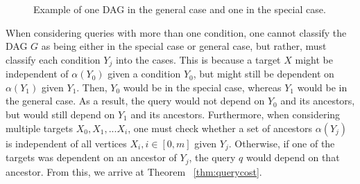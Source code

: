 
 \begin{figure}[h!]
\centering
\begin{center}
\end{center}
\caption{Example of one DAG in the general case and one in the special case.}
\label{fig:qe2}
\end{figure}



\null \quad \quad When considering queries with more than one condition, one cannot classify the DAG $G$ as being either in the special case or general case, but rather, must classify each condition $Y_{j}$ into the cases. This is because a target $X$ might be independent of $\alpha(Y_{0})$ given a condition $Y_{0}$, but might still be dependent on $\alpha(Y_{1})$ given $Y_{1}$. Then, $Y_{0}$ would be in the special case, whereas $Y_{1}$ would be in the general case. As a result, the query would not depend on $Y_{0}$ and its ancestors, but would still depend on $Y_{1}$ and its ancestors. \newline
\null \quad \quad Furthermore, when considering multiple targets $X_{0}, X_{1}, ... X_{i}$, one must check whether a set of ancestors $\alpha(Y_{j})$ is independent of all vertices $X_{i}, i\in [0,m]$ given $Y_{j}$. Otherwise, if one of the targets was dependent on an ancestor of $Y_{j}$, the query $q$ would depend on that ancestor. From this, we arrive at Theorem ~\ref{thm:querycost}.


